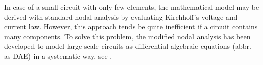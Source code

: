 \documentclass[a4paper, 10pt, twoside, twocolumn]{scrartcl}
\begin{document}
In case of a small circuit with only few elements, the mathematical model may be derived with standard nodal analysis by evaluating Kirchhoff's voltage and current law. However, this approach tends be quite inefficient if a circuit contains many components. To solve this problem, the modified nodal analysis has been developed to model large scale circuits as differential-algebraic equations (abbr. as DAE) in a systematic way, see \cite[p. 27 ff.]{book:najm2010circuit} \cite{article:tischendorf1998topological,article:marz2003finding}.








%
%

\end{document}
